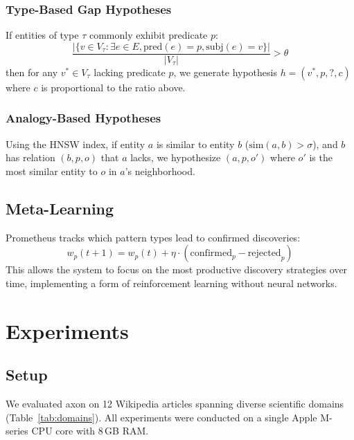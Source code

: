 \documentclass[11pt,twocolumn]{article}
\begin{document}
\subsubsection{Type-Based Gap Hypotheses}

If entities of type $\tau$ commonly exhibit predicate $p$:
\begin{equation}
  \frac{|\{v \in V_\tau : \exists e \in E, \text{pred}(e) = p, \text{subj}(e) = v\}|}{|V_\tau|} > \theta
\end{equation}
then for any $v^* \in V_\tau$ lacking predicate $p$, we generate hypothesis $h = (v^*, p, ?, c)$ where $c$ is proportional to the ratio above.

\subsubsection{Analogy-Based Hypotheses}

Using the HNSW index, if entity $a$ is similar to entity $b$ ($\text{sim}(a,b) > \sigma$), and $b$ has relation $(b, p, o)$ that $a$ lacks, we hypothesize $(a, p, o')$ where $o'$ is the most similar entity to $o$ in $a$'s neighborhood.

\subsection{Meta-Learning}

Prometheus tracks which pattern types lead to confirmed discoveries:
\begin{equation}
  w_p(t+1) = w_p(t) + \eta \cdot (\text{confirmed}_p - \text{rejected}_p)
\end{equation}
This allows the system to focus on the most productive discovery strategies over time, implementing a form of reinforcement learning without neural networks.

\section{Experiments}
\label{sec:experiments}

\subsection{Setup}

We evaluated axon on 12 Wikipedia articles spanning diverse scientific domains (Table~\ref{tab:domains}). All experiments were conducted on a single Apple M-series CPU core with 8\,GB RAM.
\end{document}
